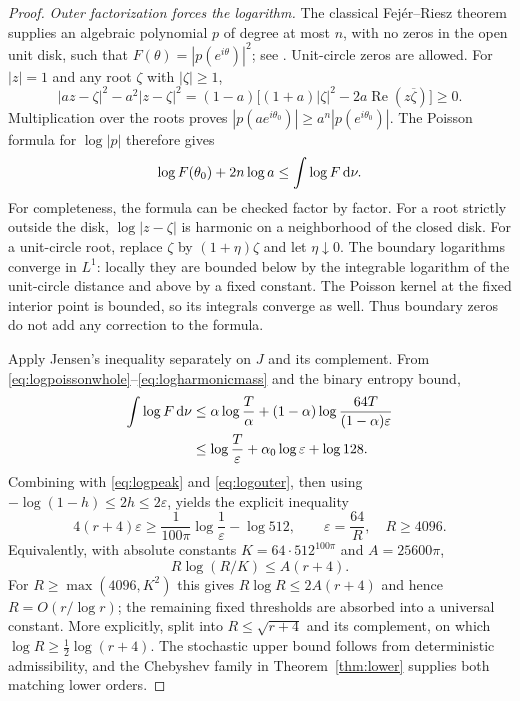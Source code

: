 \begin{proof}
\emph{Outer factorization forces the logarithm.}
The classical Fej\'er--Riesz theorem supplies an algebraic polynomial $p$ of degree at most $n$, with no zeros in the open unit disk, such that
$F(\theta)=|p(e^{i\theta})|^2$; see \cite[Introduction]{dritschelwoerdeman}. Unit-circle zeros are allowed. For $|z|=1$ and any root $\zeta$ with $|\zeta|\ge1$,
\[
|az-\zeta|^2-a^2|z-\zeta|^2
=(1-a)\big[(1+a)|\zeta|^2-2a\operatorname{Re}(z\overline\zeta)\big]\ge0.
\]
Multiplication over the roots proves
$|p(ae^{i\theta_0})|\ge a^n|p(e^{i\theta_0})|$.
The Poisson formula for $\log|p|$ therefore gives
\begin{equation}
\log F(\theta_0)+2n\log a\le\int\log F\,\mathrm d\nu.
\label{eq:logouter}
\end{equation}
For completeness, the formula can be checked factor by factor. For a root strictly outside the disk, $\log|z-\zeta|$ is harmonic on a neighborhood of the closed disk. For a unit-circle root, replace $\zeta$ by $(1+\eta)\zeta$ and let $\eta\downarrow0$. The boundary logarithms converge in $L^1$: locally they are bounded below by the integrable logarithm of the unit-circle distance and above by a fixed constant. The Poisson kernel at the fixed interior point is bounded, so its integrals converge as well. Thus boundary zeros do not add any correction to the formula.

Apply Jensen's inequality separately on $J$ and its complement. From
\eqref{eq:logpoissonwhole}--\eqref{eq:logharmonicmass} and the binary entropy bound,
\begin{align*}
\int\log F\,\mathrm d\nu
&\le\alpha\log\frac{T}{\alpha}
 +(1-\alpha)\log\frac{64T}{(1-\alpha)\varepsilon}\\
&\le\log\frac{T}{\varepsilon}+\alpha_0\log\varepsilon+\log128.
\end{align*}
Combining with \eqref{eq:logpeak} and \eqref{eq:logouter}, then using
$-\log(1-h)\le2h\le2\varepsilon$, yields the explicit inequality
\begin{equation}
4(r+4)\varepsilon
\ge\frac1{100\pi}\log\frac1\varepsilon-\log512,
\qquad \varepsilon=\frac{64}{R},\quad R\ge4096.
\label{eq:logimplicit}
\end{equation}
Equivalently, with absolute constants
$K=64\cdot512^{100\pi}$ and $A=25600\pi$,
\[
R\log(R/K)\le A(r+4).
\]
For $R\ge\max(4096,K^2)$ this gives $R\log R\le2A(r+4)$ and hence
$R=O(r/\log r)$; the remaining fixed thresholds are absorbed into a universal constant. More explicitly, split into $R\le\sqrt{r+4}$ and its complement, on which $\log R\ge\tfrac12\log(r+4)$. The stochastic upper bound follows from deterministic admissibility, and the Chebyshev family in Theorem~\ref{thm:lower} supplies both matching lower orders.
\end{proof}

